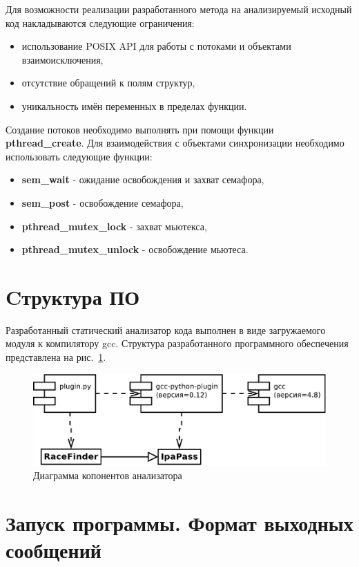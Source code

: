Для возможности реализации разработанного метода на анализируемый исходный код накладываются следующие ограничения:
\begin{itemize}
  \item использование POSIX API для работы с потоками и объектами взаимоисключения,
  \item отсутствие обращений к полям структур,
  \item уникальность имён переменных в пределах функции.
\end{itemize}

Создание потоков необходимо выполнять при помощи функции \textbf{pthread\_create}. Для взаимодействия с объектами синхронизации необходимо использовать следующие функции:
\begin{itemize}
  \item \textbf{sem\_wait} - ожидание освобождения и захват семафора,
  \item \textbf{sem\_post} - освобождение семафора,
  \item \textbf{pthread\_mutex\_lock} - захват мьютекса,
  \item \textbf{pthread\_mutex\_unlock} - освобождение мьютеса.
\end{itemize}


\section{Cтруктура ПО}

Разработанный статический анализатор кода выполнен в виде загружаемого модуля к компилятору gcc. Структура разработанного программного обеспечения представлена на рис.~\ref{fig:components}.

\begin{figure}
  \centering
  \includegraphics[width=\textwidth]{inc/dia/components}
  \caption{Диаграмма копонентов анализатора}
  \label{fig:components}
\end{figure}

\section{Запуск программы. Формат выходных сообщений}


